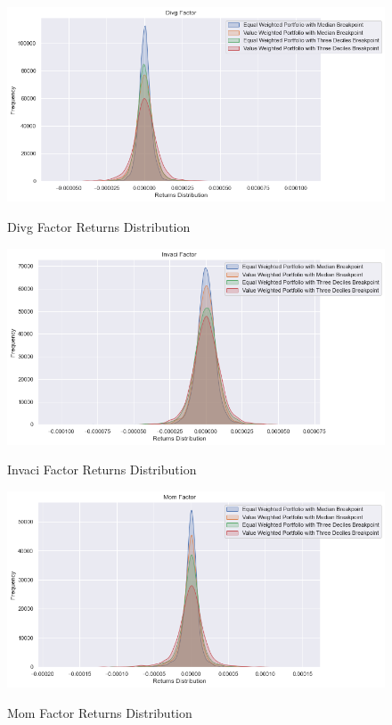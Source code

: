 \begin{figure}[H]
	\caption{Divg Factor Returns Distribution}
	\centering
	\includegraphics[scale=.63]{../../output/figures/divg.png}
	\label{fig:divg}
\end{figure}

\begin{figure}[H]
	\caption{Invaci Factor Returns Distribution}
	\centering
	\includegraphics[scale=.63]{../../output/figures/invaci.png}
	\label{fig:invaci}
\end{figure}

\begin{figure}[H]
	\caption{Mom Factor Returns Distribution}
	\centering
	\includegraphics[scale=.63]{../../output/figures/mom.png}
	\label{fig:mom}
\end{figure}

